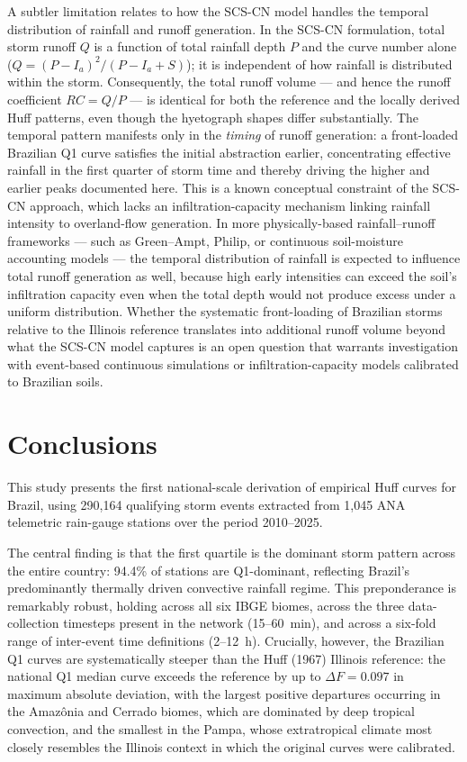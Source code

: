 \documentclass[a4paper,fleqn]{cas-sc}
\begin{document}
A subtler limitation relates to how the SCS-CN model handles
the temporal distribution of rainfall and runoff generation.
In the SCS-CN formulation, total storm runoff $Q$ is a function of
total rainfall depth $P$ and the curve number alone
($Q = (P - I_a)^2 / (P - I_a + S)$); it is independent of how
rainfall is distributed within the storm.
Consequently, the total runoff volume — and hence the runoff
coefficient $RC = Q/P$ — is identical for both the reference and the
locally derived Huff patterns, even though the hyetograph shapes differ
substantially.
The temporal pattern manifests only in the \emph{timing} of runoff
generation: a front-loaded Brazilian Q1 curve satisfies the initial
abstraction earlier, concentrating effective rainfall in the first
quarter of storm time and thereby driving the higher and earlier peaks
documented here.
This is a known conceptual constraint of the SCS-CN approach, which
lacks an infiltration-capacity mechanism linking rainfall intensity to
overland-flow generation.
In more physically-based rainfall–runoff frameworks — such as
Green–Ampt, Philip, or continuous soil-moisture accounting models — the
temporal distribution of rainfall is expected to influence total runoff
generation as well, because high early intensities can exceed the
soil's infiltration capacity even when the total depth would not
produce excess under a uniform distribution.
Whether the systematic front-loading of Brazilian storms relative to
the Illinois reference translates into additional runoff volume beyond
what the SCS-CN model captures is an open question that warrants
investigation with event-based continuous simulations or
infiltration-capacity models calibrated to Brazilian soils.

\section{Conclusions}
\label{sec:conclusions}

This study presents the first national-scale derivation of empirical
Huff curves for Brazil, using 290,164 qualifying storm events
extracted from 1,045 ANA telemetric rain-gauge stations over the
period 2010–2025.

The central finding is that the first quartile is the dominant storm
pattern across the entire country: 94.4\% of stations are Q1-dominant,
reflecting Brazil's predominantly thermally driven convective rainfall
regime. This preponderance is remarkably robust, holding across all
six IBGE biomes, across the three data-collection timesteps present in
the network (15–60~min), and across a six-fold range of inter-event
time definitions (2–12~h). Crucially, however, the Brazilian Q1 curves
are systematically steeper than the Huff (1967) Illinois reference:
the national Q1 median curve exceeds the reference by up to
$\Delta F = 0.097$ in maximum absolute deviation, with the largest
positive departures occurring in the Amazônia and Cerrado biomes,
which are dominated by deep tropical convection, and the smallest in
the Pampa, whose extratropical climate most closely resembles the
Illinois context in which the original curves were calibrated.
\end{document}
